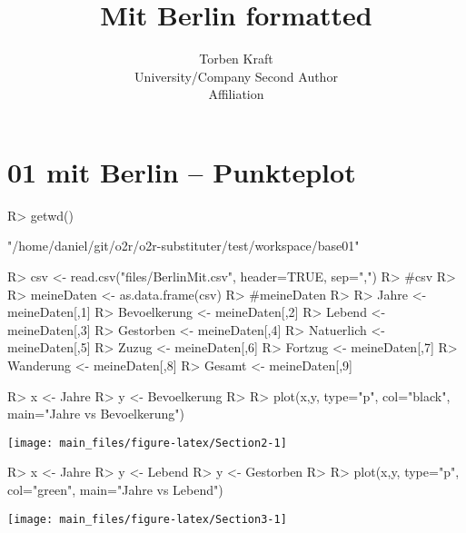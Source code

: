 \documentclass[article]{jss}
\author{
Torben Kraft\\University/Company \And Second Author\\Affiliation
}
\title{Mit Berlin formatted}
\begin{document}
\hypertarget{mit-berlin-punkteplot}{%
\section{01 mit Berlin -- Punkteplot}\label{mit-berlin-punkteplot}}

\begin{CodeChunk}

\begin{CodeInput}
R> getwd()
\end{CodeInput}

\begin{CodeOutput}
[1] "/home/daniel/git/o2r/o2r-substituter/test/workspace/base01"
\end{CodeOutput}

\begin{CodeInput}
R> csv <- read.csv("files/BerlinMit.csv", header=TRUE, sep=",")
R> #csv
R> 
R> meineDaten <-  as.data.frame(csv)
R> #meineDaten
R> 
R> Jahre <- meineDaten[,1]
R> Bevoelkerung <- meineDaten[,2]
R> Lebend <- meineDaten[,3]
R> Gestorben <- meineDaten[,4]
R> Natuerlich <- meineDaten[,5]
R> Zuzug <- meineDaten[,6]
R> Fortzug <- meineDaten[,7]
R> Wanderung <- meineDaten[,8]
R> Gesamt <- meineDaten[,9]
\end{CodeInput}
\end{CodeChunk}
\begin{CodeChunk}

\begin{CodeInput}
R> x <- Jahre
R> y <- Bevoelkerung
R> 
R> plot(x,y, type="p", col="black", main="Jahre vs Bevoelkerung")
\end{CodeInput}


\begin{center}\texttt{[image: main\_files/figure-latex/Section2-1]} \end{center}

\end{CodeChunk}
\begin{CodeChunk}

\begin{CodeInput}
R> x <- Jahre
R> y <- Lebend
R> y <- Gestorben
R> 
R> plot(x,y, type="p", col="green", main="Jahre vs Lebend")
\end{CodeInput}


\begin{center}\texttt{[image: main\_files/figure-latex/Section3-1]} \end{center}

\end{CodeChunk}
\end{document}
